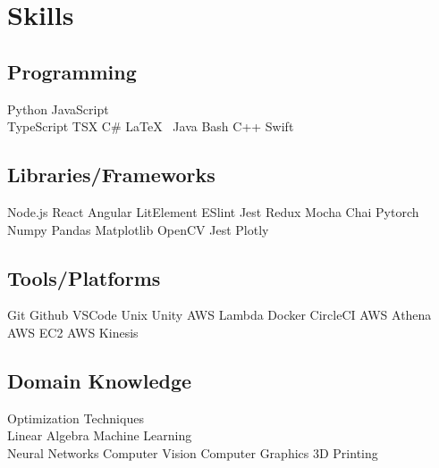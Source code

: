 \documentclass[]{plushcv}
\begin{document}
\begin{minipage}[t]{0.25\textwidth}


    \section{Skills}
    \subsection{Programming}
    \sectionsep
    Python \textbullet{} 
    JavaScript \textbullet{} \\ 
    TypeScript \textbullet{} 
    TSX \textbullet{} 
    C\# \textbullet{}
    \LaTeX\ \textbullet{}
    Java \textbullet{}  
    Bash \textbullet{}
    C++ \textbullet{} 
    Swift 
    \sectionsep{}
    \sectionsep{}
    \subsection{Libraries/Frameworks}
    \sectionsep{}
    Node.js \textbullet{}
    React \textbullet{}
    Angular \textbullet{}
    LitElement \textbullet{}
    ESlint \textbullet{} 
    Jest \textbullet{}
    Redux \textbullet{}
    Mocha \textbullet{} 
    Chai  \textbullet{} 
    Pytorch \textbullet{} 
    Numpy \textbullet{} 
    Pandas \textbullet{} 
    Matplotlib \textbullet{} 
    OpenCV \textbullet {} 
    Jest \textbullet{} 
    Plotly \textbullet{}
    \sectionsep{}
    \sectionsep{}
    \subsection{Tools/Platforms}
    \sectionsep{}
    Git \textbullet{} 
    Github \textbullet{}
    VSCode \textbullet{}  
    Unix \textbullet{}
    Unity \textbullet{} 
    AWS Lambda \textbullet{}
    Docker \textbullet{} 
    CircleCI \textbullet{} 
    AWS Athena \textbullet{}
    AWS EC2 \textbullet{}
    AWS Kinesis \textbullet{}
    \sectionsep{}
    \sectionsep{}
    \subsection{Domain Knowledge}
    \sectionsep
    Optimization Techniques \textbullet{} \\
    Linear Algebra \textbullet{}
    Machine Learning \textbullet{} \\ Neural Networks \textbullet{}
    Computer Vision \textbullet{} Computer Graphics \textbullet{} 3D Printing
    \sectionsep


\end{minipage}
\end{document}
